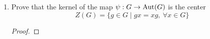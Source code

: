 \documentclass[../psets.tex]{subfiles}
\begin{document}
\begin{enumerate}
\begin{enumerate}
        \begin{proof}
            Let $x,y,g\in G$ be arbitrary. Then we have that
            \begin{equation*}
                [\psi(xy)](g) = \phi_{xy}(g)
                = (xy)g(xy)^{-1}
                = xygy^{-1}x^{-1}
                = x\phi_y(g)x^{-1}
                = \phi_x(\phi_y(g))
                = [\phi_x\circ\phi_y](g)
            \end{equation*}
            as desired.
        \end{proof}
        \item Prove that the kernel of the map $\psi:G\to\operatorname{Aut}(G)$ is the center
        \begin{equation*}
            Z(G) = \{g\in G\mid gx=xg,\ \forall x\in G\}
        \end{equation*}
        \begin{proof}
            




\end{proof}
\end{enumerate}
\end{enumerate}
\end{document}

